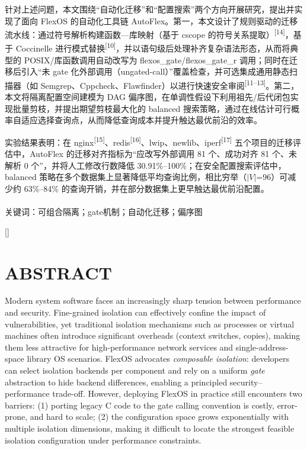 \documentclass[UTF8,a4paper,12pt,twoside]{ctexart}  %
\newcommand{\timesnewroman}{\setmainfont[
AutoFakeBold=2,
Path=Font/
]{times}}
\begin{document}
针对上述问题，本文围绕``自动化迁移''和``配置搜索''两个方向开展研究，提出并实现了面向
FlexOS 的自动化工具链
AutoFlex。第一，本文设计了规则驱动的迁移流水线：通过符号解析构建函数---库映射（基于
cscope 的符号关系提取）\textsuperscript{[14]}，基于 Coccinelle
进行模式替换\textsuperscript{[10]}，并以语句级后处理补齐复杂语法形态，从而将典型的
POSIX/库函数调用自动改写为 flexos\_gate/flexos\_gate\_r
调用；同时在迁移后引入``未 gate
化外部调用（ungated-call）''覆盖检查，并可选集成通用静态扫描器（如
Semgrep、Cppcheck、Flawfinder）以进行快速安全审阅\textsuperscript{[11--13]}。第二，本文将隔离配置空间建模为
DAG
偏序图，在单调性假设下利用祖先/后代闭包实现批量剪枝，并提出期望剪枝最大化的
balanced
搜索策略，通过在线估计可行概率自适应选择查询点，从而降低查询成本并提升触达最优前沿的效率。

实验结果表明：在
nginx\textsuperscript{[15]}、redis\textsuperscript{[16]}、lwip、newlib、iperf\textsuperscript{[17]}
五个项目的迁移评估中，AutoFlex 的迁移对齐指标为``应改写外部调用 81
个、成功对齐 81 个、未解析 0 个''，并将人工修改行数降低
30.91\%--100\%；在安全配置搜索评估中，balanced
策略在多个数据集上显著降低平均查询比例，相比穷举（$|V|$=96）可减少约
63\%--84\% 的查询开销，并在部分数据集上更早触达最优前沿配置。\\
~\\
{\heiti {}关键词}：可组合隔离；gate机制；自动化迁移；偏序图\\


\newpage
{}

\titleformat{\section}[block]{\centering\bfseries\timesnewroman\fontsize{16pt}{20pt}\selectfont}{\thesection}{1em}{}[]

\section*{ABSTRACT}
Modern system software faces an increasingly sharp tension between
performance and security. Fine-grained isolation can effectively confine
the impact of vulnerabilities, yet traditional isolation mechanisms such
as processes or virtual machines often introduce significant overheads
(context switches, copies), making them less attractive for
high-performance network services and single-address-space library OS
scenarios. FlexOS advocates \emph{composable isolation}: developers can
select isolation backends per component and rely on a uniform
\emph{gate} abstraction to hide backend differences, enabling a
principled security--performance trade-off. However, deploying FlexOS in
practice still encounters two barriers: (1) porting legacy C code to the
gate calling convention is costly, error-prone, and hard to scale; (2)
the configuration space grows exponentially with multiple isolation
dimensions, making it difficult to locate the strongest feasible
isolation configuration under performance constraints.
\end{document}
